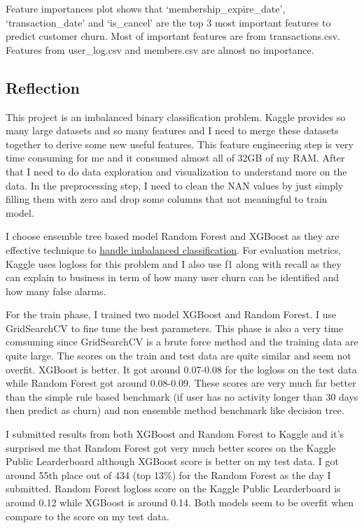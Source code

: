 \documentclass[11pt]{article}
\begin{document}
    Feature importances plot shows that `membership\_expire\_date',
`transaction\_date' and `is\_cancel' are the top 3 most important
features to predict customer churn. Most of important features are from
transactions.csv. Features from user\_log.csv and members.csv are almost
no importance.

    \subsection{Reflection}\label{reflection}

This project is an imbalanced binary classification problem. Kaggle
provides so many large datasets and so many features and I need to merge
these datasets together to derive some new useful features. This feature
engineering step is very time consuming for me and it consumed almost
all of 32GB of my RAM. After that I need to do data exploration and
visualization to understand more on the data. In the preprocessing step,
I need to clean the NAN values by just simply filling them with zero and
drop some columns that not meaningful to train model.

I choose ensemble tree based model Random Forest and XGBoost as they are
effective technique to
\href{https://www.analyticsvidhya.com/blog/2017/03/imbalanced-classification-problem/}{handle
imbalanced classification}. For evaluation metrics, Kaggle uses logloss
for this problem and I also use f1 along with recall as they can explain
to business in term of how many user churn can be identified and how
many false alarms.

For the train phase, I trained two model XGBoost and Random Forest. I
use GridSearchCV to fine tune the best parameters. This phase is also a
very time comsuming since GridSearchCV is a brute force method and the
training data are quite large. The scores on the train and test data are
quite similar and seem not overfit. XGBoost is better. It got around
0.07-0.08 for the logloss on the test data while Random Forest got
around 0.08-0.09. These scores are very much far better than the simple
rule based benchmark (if user has no activity longer than 30 days then
predict as churn) and non ensemble method benchmark like decision tree.

I submitted results from both XGBoost and Random Forest to Kaggle and
it's surprised me that Random Forest got very much better scores on the
Kaggle Public Learderboard although XGBoost score is better on my test
data. I got around 55th place out of 434 (top 13\%) for the Random
Forest as the day I submitted. Random Forest logloss score on the Kaggle
Public Learderboard is around 0.12 while XGBoost is around 0.14. Both
models seem to be overfit when compare to the score on my test data.
\end{document}
